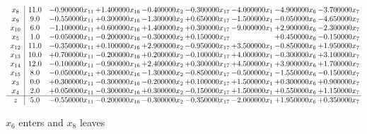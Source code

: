 \documentclass[10pt]{article}
\begin{document}
 \[\begin{array}{c| c c@{\hskip 2pt} c@{\hskip 2pt} c@{\hskip 2pt} c@{\hskip 2pt} c@{\hskip 2pt} c@{\hskip 2pt} c@{\hskip 2pt} }
 x_{8}   &  11.0 & -0.900000 x_{11} & + 1.400000 x_{16} & -0.400000 x_{2} & -0.300000 x_{17} & -4.000000 x_{1} & -4.900000 x_{6} & -3.700000 x_{7}\\
 x_{9}   &  9.0 & -0.550000 x_{11} & + 0.300000 x_{16} & -1.300000 x_{2} & + 0.650000 x_{17} & -1.500000 x_{1} & -0.050000 x_{6} & -4.650000 x_{7}\\
 x_{10}   &  6.0 & -1.100000 x_{11} & + 0.600000 x_{16} & + 1.400000 x_{2} & + 0.300000 x_{17} & -9.000000 x_{1} & + 2.900000 x_{6} & -2.300000 x_{7}\\
 x_{5}   &  1.0 & -0.050000 x_{11} & -0.200000 x_{16} & -0.300000 x_{2} & + 0.150000 x_{17} &   & + 0.450000 x_{6} & -0.150000 x_{7}\\
 x_{12}   &  11.0 & -0.350000 x_{11} & + 0.100000 x_{16} & + 2.900000 x_{2} & -0.950000 x_{17} & + 3.500000 x_{1} & -0.850000 x_{6} & + 1.950000 x_{7}\\
 x_{13}   &  10.0 & + 0.700000 x_{11} & -0.200000 x_{16} & + 0.200000 x_{2} & -0.100000 x_{17} & + 4.000000 x_{1} & -0.300000 x_{6} & + 3.100000 x_{7}\\
 x_{14}   &  12.0 & -0.100000 x_{11} & -0.900000 x_{16} & + 2.400000 x_{2} & + 0.300000 x_{17} & + 4.500000 x_{1} & + 3.900000 x_{6} & + 1.700000 x_{7}\\
 x_{15}   &  8.0 & -0.050000 x_{11} & + 0.300000 x_{16} & -1.300000 x_{2} & -0.850000 x_{17} & -0.500000 x_{1} & -1.550000 x_{6} & -0.150000 x_{7}\\
 x_{3}   &  0.0 & + 0.300000 x_{11} & -0.300000 x_{16} & -0.200000 x_{2} & + 0.100000 x_{17} & + 1.500000 x_{1} & + 0.300000 x_{6} & + 0.900000 x_{7}\\
 x_{4}   &  2.0 & + 0.050000 x_{11} & -0.300000 x_{16} & + 0.300000 x_{2} & -0.150000 x_{17} & + 1.500000 x_{1} & + 0.550000 x_{6} & + 1.150000 x_{7}\\
\hline
z    &  5.0 & -0.550000 x_{11} & -0.200000 x_{16} & -0.300000 x_{2} & -0.350000 x_{17} & -2.000000 x_{1} & + 1.950000 x_{6} & + 0.350000 x_{7}\\
\end{array}\]


 $ x_{6} $ enters and $ x_{8} $ leaves 
\end{document}
